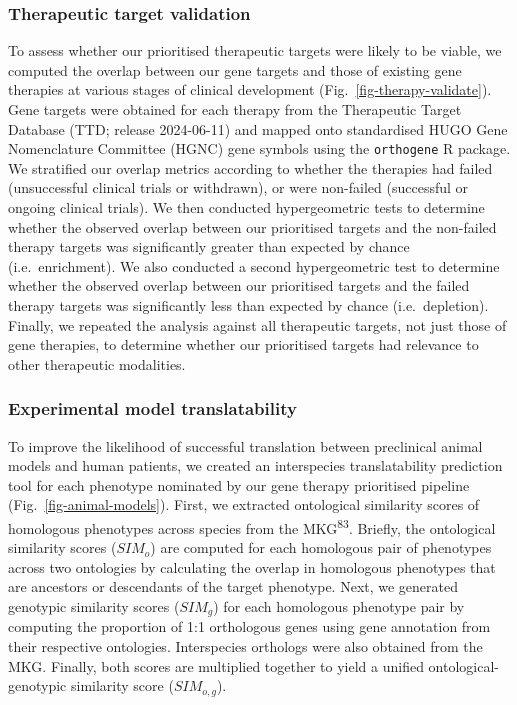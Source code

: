 \documentclass[
]{agujournal2019}
\begin{document}
\subsubsection{Therapeutic target
validation}\label{therapeutic-target-validation-1}

To assess whether our prioritised therapeutic targets were likely to be
viable, we computed the overlap between our gene targets and those of
existing gene therapies at various stages of clinical development
(Fig.~\ref{fig-therapy-validate}). Gene targets were obtained for each
therapy from the Therapeutic Target Database (TTD; release 2024-06-11)
and mapped onto standardised HUGO Gene Nomenclature Committee (HGNC)
gene symbols using the \texttt{orthogene} R package. We stratified our
overlap metrics according to whether the therapies had failed
(unsuccessful clinical trials or withdrawn), or were non-failed
(successful or ongoing clinical trials). We then conducted
hypergeometric tests to determine whether the observed overlap between
our prioritised targets and the non-failed therapy targets was
significantly greater than expected by chance (i.e.~enrichment). We also
conducted a second hypergeometric test to determine whether the observed
overlap between our prioritised targets and the failed therapy targets
was significantly less than expected by chance (i.e.~depletion).
Finally, we repeated the analysis against all therapeutic targets, not
just those of gene therapies, to determine whether our prioritised
targets had relevance to other therapeutic modalities.

\subsubsection{Experimental model
translatability}\label{experimental-model-translatability-1}

To improve the likelihood of successful translation between preclinical
animal models and human patients, we created an interspecies
translatability prediction tool for each phenotype nominated by our gene
therapy prioritised pipeline (Fig.~\ref{fig-animal-models}). First, we
extracted ontological similarity scores of homologous phenotypes across
species from the MKG\textsuperscript{83}. Briefly, the ontological
similarity scores (\(SIM_o\)) are computed for each homologous pair of
phenotypes across two ontologies by calculating the overlap in
homologous phenotypes that are ancestors or descendants of the target
phenotype. Next, we generated genotypic similarity scores (\(SIM_g\))
for each homologous phenotype pair by computing the proportion of 1:1
orthologous genes using gene annotation from their respective
ontologies. Interspecies orthologs were also obtained from the MKG.
Finally, both scores are multiplied together to yield a unified
ontological-genotypic similarity score (\(SIM_{o,g}\)).
\end{document}
